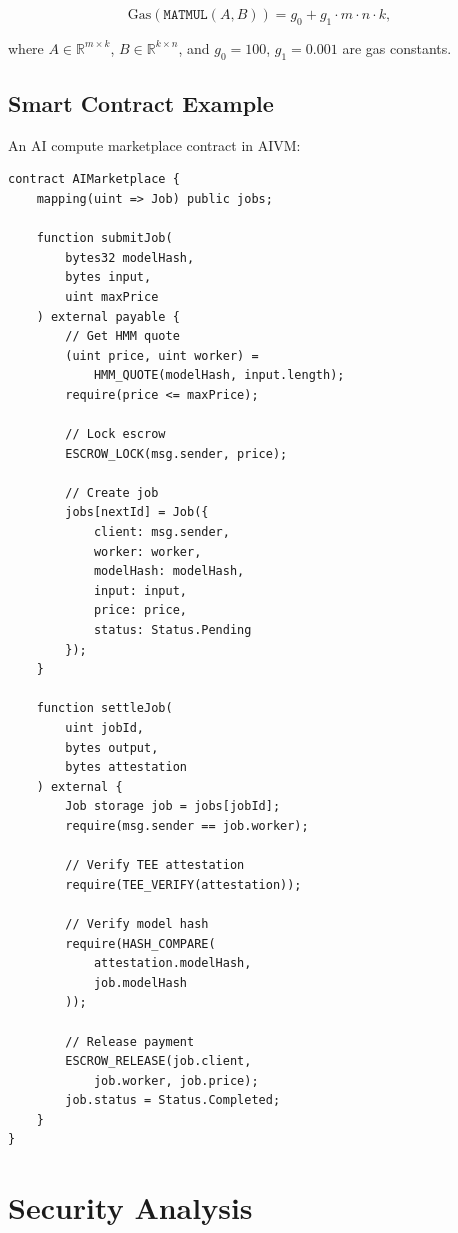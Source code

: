 \documentclass[11pt,twocolumn]{article}
\begin{document}
\begin{equation}
\text{Gas}(\texttt{MATMUL}(A, B)) = g_0 + g_1 \cdot m \cdot n \cdot k,
\end{equation}

where $A \in \mathbb{R}^{m \times k}$, $B \in \mathbb{R}^{k \times n}$, and $g_0 = 100$, $g_1 = 0.001$ are gas constants.

\subsection{Smart Contract Example}

An AI compute marketplace contract in AIVM:

\begin{lstlisting}[caption={AIVM marketplace contract (pseudocode).}]
contract AIMarketplace {
    mapping(uint => Job) public jobs;

    function submitJob(
        bytes32 modelHash,
        bytes input,
        uint maxPrice
    ) external payable {
        // Get HMM quote
        (uint price, uint worker) =
            HMM_QUOTE(modelHash, input.length);
        require(price <= maxPrice);

        // Lock escrow
        ESCROW_LOCK(msg.sender, price);

        // Create job
        jobs[nextId] = Job({
            client: msg.sender,
            worker: worker,
            modelHash: modelHash,
            input: input,
            price: price,
            status: Status.Pending
        });
    }

    function settleJob(
        uint jobId,
        bytes output,
        bytes attestation
    ) external {
        Job storage job = jobs[jobId];
        require(msg.sender == job.worker);

        // Verify TEE attestation
        require(TEE_VERIFY(attestation));

        // Verify model hash
        require(HASH_COMPARE(
            attestation.modelHash,
            job.modelHash
        ));

        // Release payment
        ESCROW_RELEASE(job.client,
            job.worker, job.price);
        job.status = Status.Completed;
    }
}
\end{lstlisting}

\section{Security Analysis}
\label{sec:security}
\end{document}
